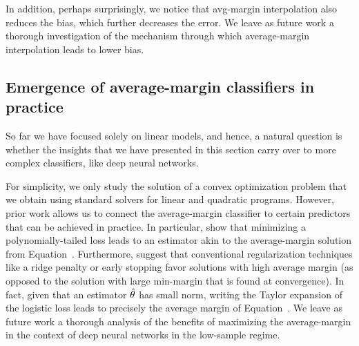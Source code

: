 In addition, perhaps surprisingly, we notice that avg-margin interpolation also
reduces the bias, which further decreases the error. We leave as future work a
thorough investigation of the mechanism through which average-margin
interpolation leads to lower bias.

\subsection{Emergence of average-margin classifiers in practice}

So far we have focused solely on linear models, and hence, a natural question is
whether the insights that we have presented in this section carry over to more
complex classifiers, like deep neural networks.

For simplicity, we only study the solution of a convex optimization problem that
we obtain using standard solvers for linear and quadratic programs. However,
prior work allows us to connect the average-margin classifier to certain
predictors that can be achieved in practice.  In particular, \citet{wang21} show
that minimizing a polynomially-tailed loss leads to an estimator akin to the
average-margin solution from Equation~. Furthermore, \citet{ro}
suggest that conventional regularization techniques like a ridge penalty or
early stopping favor solutions with high average margin (as opposed to the
solution with large min-margin that is found at convergence). In fact, given
that an estimator $\hat{\theta}$ has small norm, writing the Taylor expansion of
the logistic loss leads to precisely the average margin of Equation~.
We leave as future work a thorough analysis of the benefits of maximizing the
average-margin in the context of deep neural networks in the low-sample regime.

